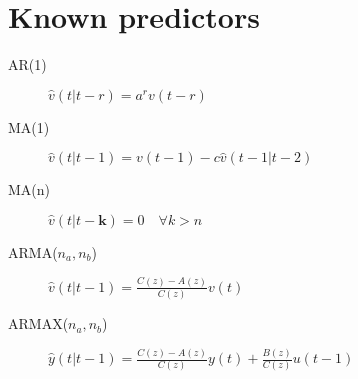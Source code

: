 \documentclass{article}
\begin{document}
\section{Known predictors}
\begin{description}
\item[AR(1)] $\hat{v}(t|t-r)=a^rv(t-r)$
\item[MA(1)] $\hat{v}(t|t-1)=v(t-1)-c\hat{v}(t-1|t-2)$
\item[MA(n)] $\hat{v}(t|t-\textbf{k})=0 \quad \forall k>n$
\item[ARMA($n_a,n_b$)] $\hat{v}(t|t-1)=
\frac{C(z)-A(z)}{C(z)}v(t)$
\item[ARMAX($n_a,n_b$)] $\hat{y}(t|t-1)=
\frac{C(z)-A(z)}{C(z)}y(t)
+\frac{B(z)}{C(z)}u(t-1)$
\end{description}
\end{document}
